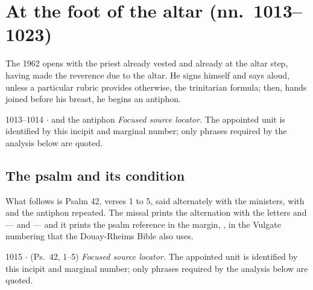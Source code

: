 \section{At the foot of the altar (nn.~1013--1023)}

The 1962  opens with the priest already vested and already
at the altar step, having made the reverence due to the altar. He signs
himself and says aloud, unless a particular rubric provides otherwise, the
trinitarian formula; then, hands joined before his breast, he begins an
antiphon.

\begin{appointed}{1013--1014 $\cdot$  and the antiphon}
\textit{Focused source locator.} The appointed unit is identified by this incipit and marginal number; only phrases required by the analysis below are quoted.
\end{appointed}

\subsection*{The psalm and its condition}

What follows is Psalm 42, verses 1 to 5, said alternately with the ministers,
with  and the antiphon repeated. The missal prints the
alternation with the letters  and  --- 
and  --- and it prints the psalm reference in the margin,
, in the Vulgate numbering that the Douay-Rheims Bible
also uses.

\begin{appointed}{1015 $\cdot$  (Ps.~42, 1--5)}
\textit{Focused source locator.} The appointed unit is identified by this incipit and marginal number; only phrases required by the analysis below are quoted.
\end{appointed}

